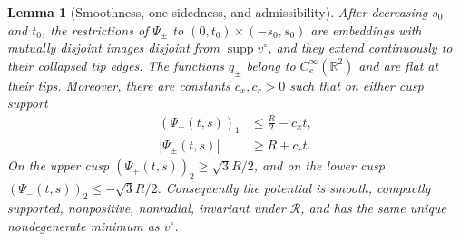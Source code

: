 \documentclass[11pt]{article}
\newtheorem{lemma}[theorem]{Lemma}
\newcommand{\R}{\mathbb R}
\newcommand{\cR}{\mathcal R}
\newcommand{\supp}{\operatorname{supp}}
\begin{document}
\begin{lemma}[Smoothness, one-sidedness, and admissibility]
\label{lem:smooth-new}
After decreasing $s_0$ and $t_0$, the restrictions of $\Psi_\pm$ to
$(0,t_0)\times(-s_0,s_0)$ are embeddings with mutually disjoint images
disjoint from $\supp v^\circ$, and they extend continuously to their collapsed
tip edges.  The functions
$q_\pm$ belong to $C_c^\infty(\R^2)$ and are flat at their tips.  Moreover,
there are constants $c_x,c_r>0$ such that on either cusp support
\begin{align}
 (\Psi_\pm(t,s))_1&\le \frac R2-c_xt,\label{eq:one-sided-x}\\
 |\Psi_\pm(t,s)|&\ge R+c_rt.\label{eq:radial-outward}
\end{align}
On the upper cusp $(\Psi_+(t,s))_2\ge\sqrt3R/2$, and on the lower cusp
$(\Psi_-(t,s))_2\le-\sqrt3R/2$.  Consequently the potential
 is smooth, compactly supported, nonpositive,
nonradial, invariant under $\cR$, and has the same unique nondegenerate
minimum as $v^\circ$.
\end{lemma}
\end{document}
